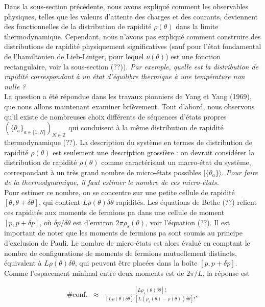 

	Dans la sous-section précédente, nous avons expliqué comment les observables physiques, telles que les valeurs d'attente des charges et des courants, deviennent des fonctionnelles de la distribution de rapidité $\rho(\theta)$ dans la limite thermodynamique. Cependant, nous n'avons pas expliqué comment construire des distributions de rapidité physiquement significatives (sauf pour l'état fondamental de l'hamiltonien de Lieb-Liniger, pour lequel $\nu(\theta)$) est une fonction rectangulaire, voir la sous-section (??)). {\em Par exemple, quelle est la distribution de rapidité correspondant à un état d'équilibre thermique à une température non nulle ?}\\
	
	La question a été répondue dans les travaux pionniers de Yang et Yang (1969), que nous allons maintenant examiner brièvement. Tout d'abord, nous observons qu'il existe de nombreuses choix différents de séquences d'états propres $(\{\theta_a\}_{ a \in \llbracket 1 , N \rrbracket} )_{ N \in \mathbb{Z}}$ qui conduisent à la même distribution de rapidité thermodynamique (??). La description du système en termes de distribution de rapidité $\rho ( \theta ) $ est seulement une description grossière : on devrait considérer la distribution de rapidité $\rho ( \theta ) $ comme caractérisant un macro-état du système, correspondant à un très grand nombre de micro-états possibles $\vert \{ \theta_a \} \rangle $. {\em Pour faire de la thermodynamique, il faut estimer le nombre de ces micro-états.}\\
	
	Pour estimer ce nombre, on se concentre sur une petite cellule de rapidité $[\theta, \theta+\delta\theta]$, qui contient $L\rho(\theta)\delta \theta$ rapidités. Les équations de Bethe (??) relient ces rapidités aux moments de fermions pa dans une cellule de moment $[p, p+\delta p]$, où $\delta p/\delta \theta$ est d'environ $2\pi \rho_s(\theta)$, voir l'équation (??). Il est important de noter que les moments de fermions pa sont soumis au principe d'exclusion de Pauli. Le nombre de micro-états est alors évalué en comptant le nombre de configurations de moments de fermions mutuellement distincts, équivalent à $L\rho (\theta)\delta \theta$, qui peuvent être placées dans la boîte $[p, p + \delta p]$. Comme l'espacement minimal entre deux moments est de $2\pi /L$, la réponse est

	\begin{eqnarray}
		\# \mbox{conf.} & \approx  & \frac{[ L \rho_s ( \theta ) \delta \theta ] ! }{ [ L \rho ( \theta ) \delta \theta ] ! [ L ( \rho_s ( \theta ) - \rho ( \theta ) )  \delta \theta ] ! } , 	
	\end{eqnarray}
	
